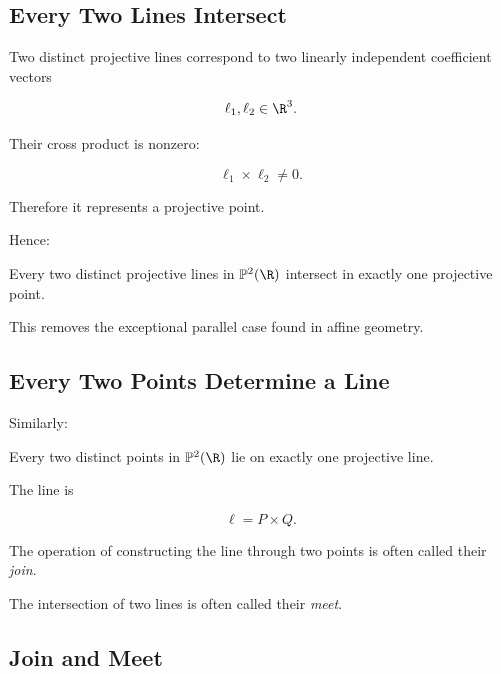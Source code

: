 \subsection{Every Two Lines Intersect}
\label{subsec:every-two-projective-lines-intersect}

Two distinct projective lines correspond to two linearly independent
coefficient vectors

\[
\ell_1,\ell_2\in\R^3.
\]

Their cross product is nonzero:

\[
\ell_1\times\ell_2\neq0.
\]

Therefore it represents a projective point.

Hence:

\begin{theorem}
Every two distinct projective lines in \(\mathbb{P}^{2}(\R)\) intersect in
exactly one projective point.
\end{theorem}

This removes the exceptional parallel case found in affine geometry.

\subsection{Every Two Points Determine a Line}
\label{subsec:two-points-projective-line}

Similarly:

\begin{theorem}
Every two distinct points in \(\mathbb{P}^{2}(\R)\) lie on exactly one
projective line.
\end{theorem}

The line is

\[
\boxed{\ell=P\times Q.}
\]

The operation of constructing the line through two points is often called
their \emph{join}.

The intersection of two lines is often called their \emph{meet}.

\subsection{Join and Meet}
\label{subsec:projective-join-meet}

